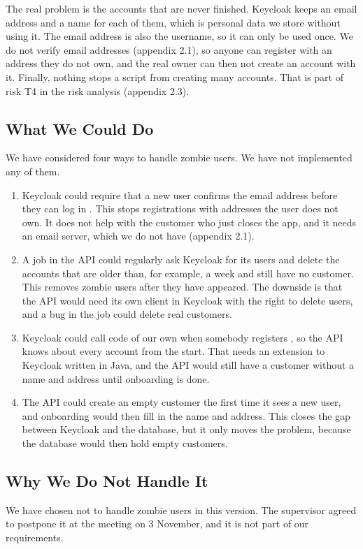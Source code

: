 \documentclass[a4paper,11pt]{article}
\begin{document}
The real problem is the accounts that are never finished. Keycloak keeps an email address and a name for each of them, which is personal data we store without using it. The email address is also the username, so it can only be used once. We do not verify email addresses (appendix 2.1), so anyone can register with an address they do not own, and the real owner can then not create an account with it. Finally, nothing stops a script from creating many accounts. That is part of risk T4 in the risk analysis (appendix 2.3).

\subsection{What We Could Do}
We have considered four ways to handle zombie users. We have not implemented any of them.
\begin{enumerate}
  \item Keycloak could require that a new user confirms the email address before they can log in \cite{keycloak-server-admin-guide}. This stops registrations with addresses the user does not own. It does not help with the customer who just closes the app, and it needs an email server, which we do not have (appendix 2.1).
  \item A job in the API could regularly ask Keycloak for its users and delete the accounts that are older than, for example, a week and still have no customer. This removes zombie users after they have appeared. The downside is that the API would need its own client in Keycloak with the right to delete users, and a bug in the job could delete real customers.
  \item Keycloak could call code of our own when somebody registers \cite{keycloak-server-admin-guide}, so the API knows about every account from the start. That needs an extension to Keycloak written in Java, and the API would still have a customer without a name and address until onboarding is done.
  \item The API could create an empty customer the first time it sees a new user, and onboarding would then fill in the name and address. This closes the gap between Keycloak and the database, but it only moves the problem, because the database would then hold empty customers.
\end{enumerate}

\subsection{Why We Do Not Handle It}
We have chosen not to handle zombie users in this version. The supervisor agreed to postpone it at the meeting on 3 November, and it is not part of our requirements.
\end{document}
